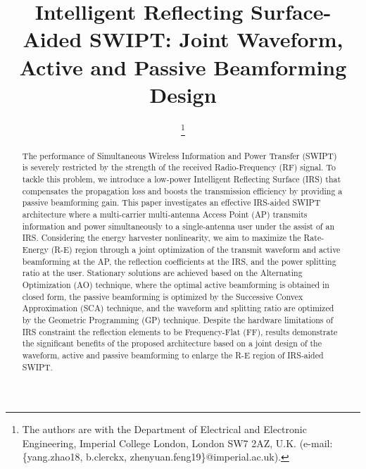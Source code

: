\documentclass[journal]{IEEEtran}
\begin{document}
	\title{Intelligent Reflecting Surface-Aided SWIPT: Joint Waveform, Active and Passive Beamforming Design}
	\author{
		\thanks{
			The authors are with the Department of Electrical and Electronic Engineering, Imperial College London, London SW7 2AZ, U.K. (e-mail: \{yang.zhao18, b.clerckx, zhenyuan.feng19\}@imperial.ac.uk).
		}
	}
	\maketitle


	\begin{abstract}
		The performance of Simultaneous Wireless Information and Power Transfer (SWIPT) is severely restricted by the strength of the received Radio-Frequency (RF) signal. To tackle this problem, we introduce a low-power Intelligent Reflecting Surface (IRS) that compensates the propagation loss and boosts the transmission efficiency by providing a passive beamforming gain. This paper investigates an effective IRS-aided SWIPT architecture where a multi-carrier multi-antenna Access Point (AP) transmits information and power simultaneously to a single-antenna user under the assist of an IRS. Considering the energy harvester nonlinearity, we aim to maximize the Rate-Energy (R-E) region through a joint optimization of the transmit waveform and active beamforming at the AP, the reflection coefficients at the IRS, and the power splitting ratio at the user. Stationary solutions are achieved based on the Alternating Optimization (AO) technique, where the optimal active beamforming is obtained in closed form, the passive beamforming is optimized by the Successive Convex Approximation (SCA) technique, and the waveform and splitting ratio are optimized by the Geometric Programming (GP) technique. Despite the hardware limitations of IRS constraint the reflection elements to be Frequency-Flat (FF), results demonstrate the significant benefits of the proposed architecture based on a joint design of the waveform, active and passive beamforming to enlarge the R-E region of IRS-aided SWIPT.
	\end{abstract}
\end{document}
